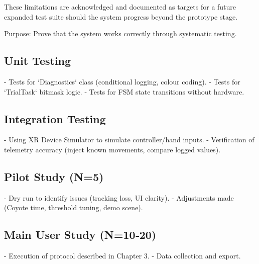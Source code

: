 These limitations are acknowledged and documented as targets for a future expanded test suite should the system progress beyond the prototype stage.

Purpose: Prove that the system works correctly through systematic testing.


\subsection{Unit Testing}
\label{}
- Tests for `Diagnostics` class (conditional logging, colour coding).
- Tests for `TrialTask` bitmask logic.
- Tests for FSM state transitions without hardware.


\subsection{Integration Testing}
\label{}
- Using XR Device Simulator to simulate controller/hand inputs.
- Verification of telemetry accuracy (inject known movements, compare logged values).


\subsection{Pilot Study (N=5)}
\label{}
- Dry run to identify issues (tracking loss, UI clarity).
- Adjustments made (Coyote time, threshold tuning, demo scene).


\subsection{Main User Study (N=10‑20)}
\label{}
- Execution of protocol described in Chapter 3.
- Data collection and export.